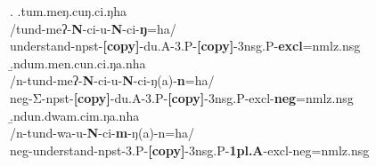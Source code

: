 \ex. \a.\glll tum.meŋ.cuŋ.ci.ŋha\\
/tund-meʔ-{\bf N}-ci-u-{\bf N}-ci-{\bf ŋ}=ha/\\
		understand{\sc -npst-{\bf [copy]}-du.A-3.P-{\bf [copy]}-3nsg.P-{\bf excl}=nmlz.nsg}\\
	\b.\glll ndum.men.cun.ci.ŋa.nha\\
	/n-tund-meʔ-{\bf N}-ci-u-{\bf N}-ci-ŋ(a)-{\bf n}=ha/\\
		{\sc neg-}Σ{\sc -npst-{\bf [copy]}-du.A-3.P-{\bf [copy]}-3nsg.P-excl-{\bf neg}=nmlz.nsg}\\
	\b.\glll ndun.dwam.cim.ŋa.nha\\
	/n-tund-wa-u-{\bf N}-ci-{\bf m}-ŋ(a)-n=ha/\\
		{\sc neg-}understand{\sc -npst-3.P-{\bf [copy]}-3nsg.P-{\bf 1pl.A}-excl-neg=nmlz.nsg}\\
		



